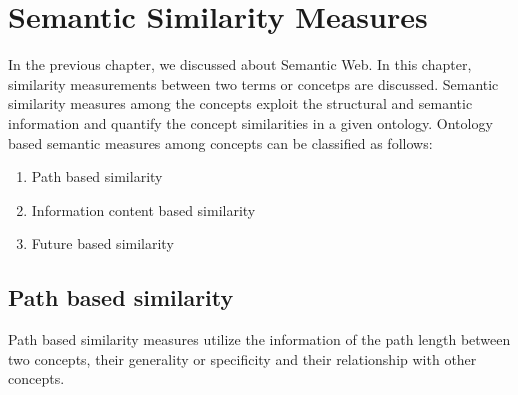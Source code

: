 \chapter{Semantic Similarity Measures} 
In the previous chapter, we discussed about Semantic Web. In this chapter,  similarity measurements \citep{hliaoutakis2006information} between two terms or concetps are discussed. Semantic similarity measures among the concepts exploit the structural and semantic information and quantify the concept similarities in a given ontology.
Ontology based semantic measures among concepts can be classified as follows:

\begin{enumerate}
\item {Path based similarity}
\item {Information content based similarity}
\item {Future based similarity}
\end{enumerate}

\section{Path based similarity} 
Path based similarity measures utilize the information of the path length between two concepts, their generality or specificity and their relationship with other concepts.

